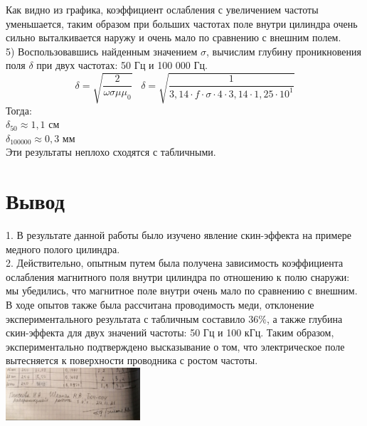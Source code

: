 \documentclass[a4paper]{article}
\begin{document}
Как видно из графика, коэффициент ослабления с увеличением частоты уменьшается, таким образом при больших частотах поле внутри цилиндра очень сильно выталкивается наружу и очень мало по сравнению с внешним полем.\\
5) Воспользовавшись найденным значением $\sigma$, вычислим глубину проникновения поля $\delta$ при двух частотах: 50 Гц и 100 000 Гц.\\
$$\delta = \sqrt{\frac{2}{\omega \sigma \mu \mu_0}} \; \; \;\delta = \sqrt{\frac{1}{ 3,14 \cdot f \cdot \sigma \cdot 4\cdot 3,14 \cdot 1,25 \cdot 10^{1}}}$$
Тогда:\\
$\delta_{50} \approx 1,1$ см\\
$\delta_{100000} \approx 0,3$ мм\\
Эти результаты неплохо сходятся с табличными.\\
\section{Вывод}
1. В результате данной работы было изучено явление скин-эффекта на примере медного полого цилиндра. \\
2. Действительно, опытным путем была получена зависимость коэффициента ослабления магнитного поля внутри цилиндра по отношению к полю снаружи: мы убедились, что магнитное поле внутри очень мало по сравнению с внешним. В ходе опытов также была рассчитана проводимость меди, отклонение экспериментального результата с табличным составило $36 \%$, а также глубина скин-эффекта для двух значений частоты: 50 Гц и 100 кГц. Таким образом, экспериментально подтверждено высказывание о том, что электрическое поле вытесняется к поверхности проводника с ростом частоты. \\
\includegraphics[width=5cm]{g8}\\
\end{document}
